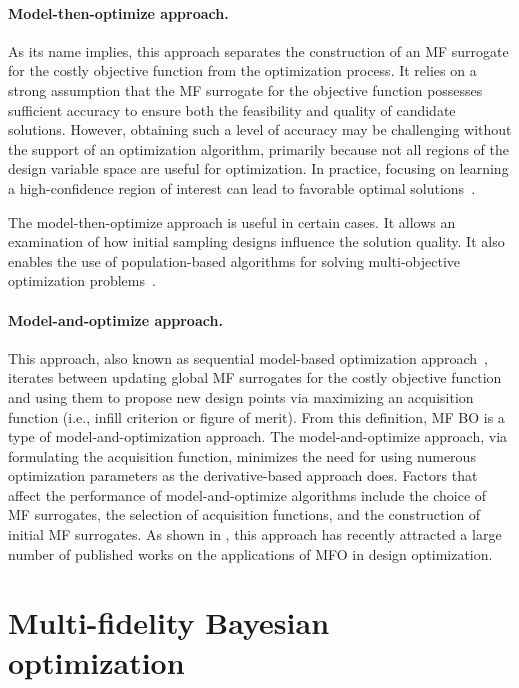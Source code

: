 \documentclass[journal ]{new-aiaa}
\begin{document}
\paragraph{Model-then-optimize approach.}
As its name implies, this approach separates the construction of an MF surrogate for the costly objective function from the optimization process.
It relies on a strong assumption that the MF surrogate for the objective function possesses sufficient accuracy to ensure both the feasibility and quality of candidate solutions.
However, obtaining such a level of accuracy may be challenging without the support of an optimization algorithm, primarily because not all regions of the design variable space are useful for optimization.
In practice, focusing on learning a high-confidence region of interest can lead to favorable optimal solutions~\citep{ZhangF2023}.
 
The model-then-optimize approach is useful in certain cases.
It allows an examination of how initial sampling designs influence the solution quality.
It also enables the use of population-based algorithms for solving multi-objective optimization problems~\citep{Viana2009,Leusink2015,Singh2017,Yang2018}.

\paragraph{Model-and-optimize approach.}
This approach, also known as sequential model-based optimization approach~\citep{Bossek2020}, iterates between updating global MF surrogates for the costly objective function and using them to propose new design points via maximizing an acquisition function (i.e., infill criterion or figure of merit).
From this definition, MF BO is a type of model-and-optimization approach. 
The model-and-optimize approach, via formulating the acquisition function, minimizes the need for using numerous optimization parameters as the derivative-based approach does.
Factors that affect the performance of model-and-optimize algorithms include the choice of MF surrogates, the selection of acquisition functions, and the construction of initial MF surrogates.
As shown in , this approach has recently attracted a large number of published works on the applications of MFO in design optimization.

\section{Multi-fidelity Bayesian optimization}\label{Sec3}
\end{document}
